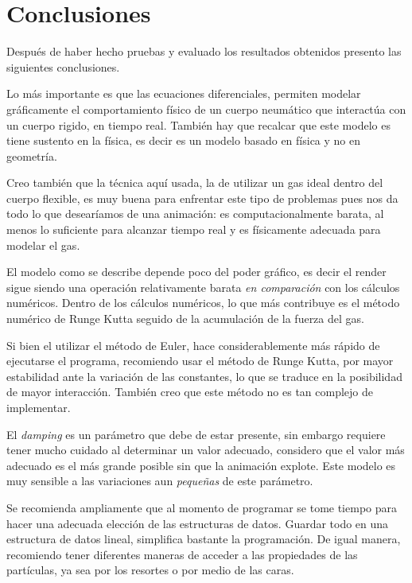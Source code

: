 \chapter*{Conclusiones}

Después de haber hecho pruebas y evaluado los resultados obtenidos presento las siguientes conclusiones.

Lo más importante es que las ecuaciones diferenciales, permiten modelar gráficamente el comportamiento físico de un cuerpo neumático que interactúa con un cuerpo rigido, en tiempo real. También hay que recalcar que este modelo es tiene sustento en la física, es decir es un modelo basado en física y no en geometría.

Creo también que la técnica aquí usada, la de utilizar un gas ideal dentro del cuerpo flexible, es muy buena para enfrentar este tipo de problemas pues nos da todo lo que desearíamos de una animación: es computacionalmente barata, al menos lo suficiente para alcanzar tiempo real y es físicamente adecuada para modelar el gas.

El modelo como se describe depende poco del poder gráfico, es decir el render sigue siendo una operación relativamente barata \emph{en comparación} con los cálculos numéricos. Dentro de los cálculos numéricos, lo que más contribuye es el método numérico de Runge Kutta seguido de la acumulación de la fuerza del gas.

Si bien el utilizar el método de Euler, hace considerablemente más rápido de ejecutarse el programa, recomiendo usar el método de Runge Kutta, por mayor estabilidad ante la variación de las constantes, lo que se traduce en la posibilidad de mayor interacción. También creo que este método no es tan complejo de implementar.

El \emph{\foreignlanguage{english}{damping}} es un parámetro que debe de estar presente, sin embargo requiere tener mucho cuidado al determinar un valor adecuado, considero que el valor más adecuado es el más grande posible sin que la animación explote. Este modelo es muy sensible a las variaciones aun \emph{pequeñas} de este parámetro.

Se recomienda ampliamente que al momento de programar se tome tiempo para hacer una adecuada elección de las estructuras de datos. Guardar todo en una estructura de datos lineal, simplifica bastante la programación. De igual manera, recomiendo tener diferentes maneras de acceder a las propiedades de las partículas, ya sea por los resortes o por medio de las caras.

